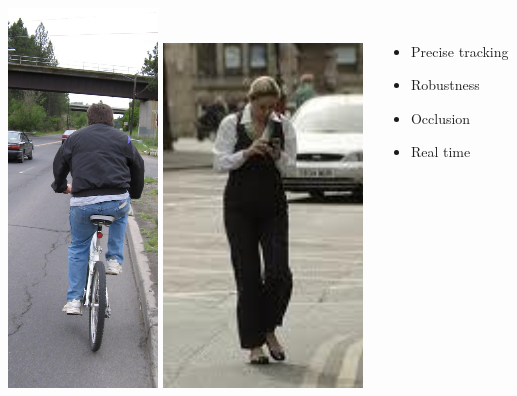 \begin{frame}
\begin{columns}
\begin{column}{0.6\textwidth}
  \hspace{0.01cm}
  \includegraphics[height=0.35\textheight]{images/cycle}
  \hspace{0.01cm}
  \includegraphics[height=0.35\textheight]{images/pedestrian}
  \end{column}
  \begin{column}{0.5\textwidth}
  \begin{description}[]
  \item[Challenges] \hfill \\
  \begin{itemize}
  \item Precise tracking
  \item Robustness
  \item Occlusion
  \item Real time
  \end{itemize}
  \end{description}
  \end{column}
  \end{columns}
\end{frame}

